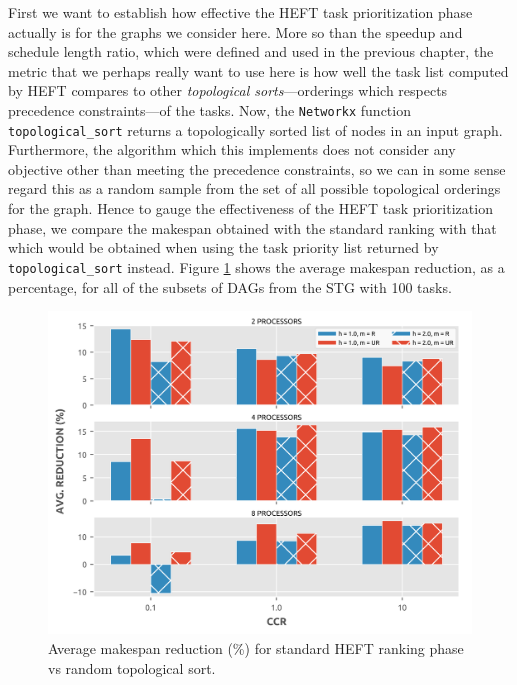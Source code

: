 \documentclass[12pt]{article}
\begin{document}

First we want to establish how effective the HEFT task prioritization phase actually is for the graphs we consider here. More so than the speedup and schedule length ratio, which were defined and used in the previous chapter, the metric that we perhaps really want to use here is how well the task list computed by HEFT compares to other {\em topological sorts}---orderings which respects precedence constraints---of the tasks. Now, the {\tt Networkx} function {\tt topological\_sort} returns a topologically sorted list of nodes in an input graph. Furthermore, the algorithm which this implements does not consider any objective other than meeting the precedence constraints, so we can in some sense regard this as a random sample from the set of all possible topological orderings for the graph. Hence to gauge the effectiveness of the HEFT task prioritization phase, we compare the makespan obtained with the standard ranking with that which would be obtained when using the task priority list returned by {\tt topological\_sort} instead. Figure \ref{plot.benchmark_reductions_100} shows the average makespan reduction, as a percentage, for all of the subsets of DAGs from the STG with 100 tasks.

\begin{figure}
	\centering	
	\includegraphics[scale=0.8]{100tasks_reductions.png}
	\caption{Average makespan reduction (\%) for standard HEFT ranking phase vs random topological sort.}	
	\label{plot.benchmark_reductions_100}
\end{figure} 
\end{document}
